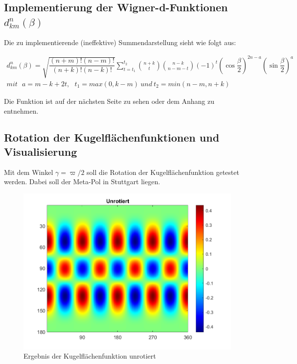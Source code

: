 \subsection{Implementierung der Wigner-d-Funktionen $d_{km}^n(\beta)$}

Die zu implementierende (ineffektive) Summendarstellung sieht wie folgt aus: 

\begin{gather}
d_{km}^n(\beta) = \sqrt{\dfrac{(n+m)!(n-m)!}{(n+k)!(n-k)!}} \sum_{t=t_1}^{t_2} \binom{n+k}{t} \binom{n-k}{n-m-t} (-1)^t \left( \cos \dfrac{\beta}{2} \right)^{2n-a} \left( \sin \dfrac{\beta}{2} \right)^a \\
mit ~~~ a = m-k+2t, ~~~ t_1 = max(0,k-m) ~ und ~ t_2 = min(n-m, n+k)
\end{gather}

Die Funktion ist auf der nächsten Seite zu sehen oder dem Anhang zu entnehmen. 



\subsection{Rotation der Kugelflächenfunktionen und Visualisierung}

Mit dem Winkel $\gamma=\varpi/2$ soll die Rotation der Kugelflächenfunktion getestet werden. Dabei soll der Meta-Pol in Stuttgart liegen. 

\begin{figure}[H]
\centering
\includegraphics[scale = 0.6]{unrotiert.png}
\caption{Ergebnis der Kugelflächenfunktion unrotiert}
\label{unrot}
\end{figure}

